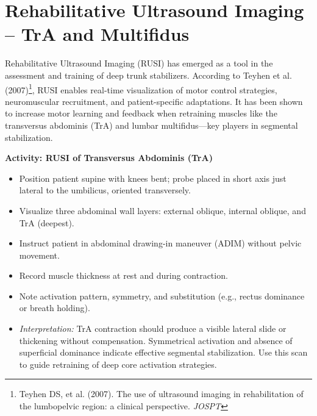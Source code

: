 \section*{Rehabilitative Ultrasound Imaging – TrA and Multifidus}

Rehabilitative Ultrasound Imaging (RUSI) has emerged as a tool in the assessment and training of deep trunk stabilizers. According to Teyhen et al. (2007)\footnote{Teyhen DS, et al. (2007). The use of ultrasound imaging in rehabilitation of the lumbopelvic region: a clinical perspective. \textit{JOSPT}}, RUSI enables real-time visualization of motor control strategies, neuromuscular recruitment, and patient-specific adaptations. It has been shown to increase motor learning and feedback when retraining muscles like the transversus abdominis (TrA) and lumbar multifidus—key players in segmental stabilization.

\begin{labactivitybox}
\textbf{Activity: RUSI of Transversus Abdominis (TrA)}

\begin{itemize}
  \item Position patient supine with knees bent; probe placed in short axis just lateral to the umbilicus, oriented transversely.
  \item Visualize three abdominal wall layers: external oblique, internal oblique, and TrA (deepest).
  \item Instruct patient in abdominal drawing-in maneuver (ADIM) without pelvic movement.
  \item Record muscle thickness at rest and during contraction.
  \item Note activation pattern, symmetry, and substitution (e.g., rectus dominance or breath holding).
  \item \textit{Interpretation:} TrA contraction should produce a visible lateral slide or thickening without compensation. Symmetrical activation and absence of superficial dominance indicate effective segmental stabilization. Use this scan to guide retraining of deep core activation strategies.
\end{itemize}
\end{labactivitybox}

